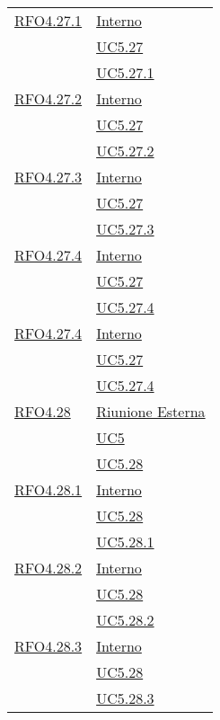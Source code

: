 \begin{longtable}{|>{\centering}m{5cm}|m{5cm}<{\centering}|}
\hyperlink{RFO4.27.1}{RFO4.27.1} &  \hyperlink{Interno}{Interno}\\ &\hyperref[UC5.27]{UC5.27}\\ &\hyperref[UC5.27.1]{UC5.27.1}\\ \hline

\hyperlink{RFO4.27.2}{RFO4.27.2} &  \hyperlink{Interno}{Interno}\\ &\hyperref[UC5.27]{UC5.27}\\ &\hyperref[UC5.27.2]{UC5.27.2}\\ \hline

\hyperlink{RFO4.27.3}{RFO4.27.3} &  \hyperlink{Interno}{Interno}\\ &\hyperref[UC5.27]{UC5.27}\\ &\hyperref[UC5.27.3]{UC5.27.3}\\ \hline


\hyperlink{RFO4.27.4}{RFO4.27.4}  &\hyperlink{Interno}{Interno}\\ &\hyperref[UC5.27]{UC5.27}\\ &\hyperref[UC5.27.4]{UC5.27.4}\\ \hline

\hyperlink{RFO4.27.4}{RFO4.27.4} & \hyperlink{Interno}{Interno}\\ &\hyperref[UC5.27]{UC5.27}\\ &\hyperref[UC5.27.4]{UC5.27.4}\\ \hline

\hyperlink{RFO4.28}{RFO4.28} &  \hyperlink{Riunione Esterna}{Riunione Esterna}\\ &\hyperref[UC5]{UC5}\\ &\hyperref[UC5.28]{UC5.28}\\ \hline

\hyperlink{RFO4.28.1}{RFO4.28.1} &  \hyperlink{Interno}{Interno}\\ &\hyperref[UC5.28]{UC5.28}\\ &\hyperref[UC5.28.1]{UC5.28.1}\\ \hline

\hyperlink{RFO4.28.2}{RFO4.28.2} &  \hyperlink{Interno}{Interno}\\ &\hyperref[UC5.28]{UC5.28}\\ &\hyperref[UC5.28.2]{UC5.28.2}\\ \hline

\hyperlink{RFO4.28.3}{RFO4.28.3} & \hyperlink{Interno}{Interno}\\ &\hyperref[UC5.28]{UC5.28}\\ &\hyperref[UC5.28.3]{UC5.28.3}\\ \hline


\end{longtable}
